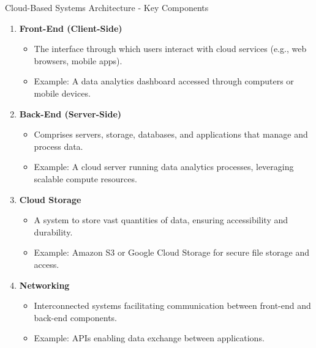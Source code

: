 \documentclass[aspectratio=169]{beamer}
\begin{document}
\begin{frame}[fragile]{Cloud-Based Systems Architecture - Key Components}
    \begin{enumerate}
        \item \textbf{Front-End (Client-Side)}
        \begin{itemize}
            \item The interface through which users interact with cloud services (e.g., web browsers, mobile apps).
            \item Example: A data analytics dashboard accessed through computers or mobile devices.
        \end{itemize}
        
        \item \textbf{Back-End (Server-Side)}
        \begin{itemize}
            \item Comprises servers, storage, databases, and applications that manage and process data.
            \item Example: A cloud server running data analytics processes, leveraging scalable compute resources.
        \end{itemize}
        
        \item \textbf{Cloud Storage}
        \begin{itemize}
            \item A system to store vast quantities of data, ensuring accessibility and durability.
            \item Example: Amazon S3 or Google Cloud Storage for secure file storage and access.
        \end{itemize}

        \item \textbf{Networking}
        \begin{itemize}
            \item Interconnected systems facilitating communication between front-end and back-end components.
            \item Example: APIs enabling data exchange between applications.
        \end{itemize}
    \end{enumerate}
\end{frame}
\end{document}
